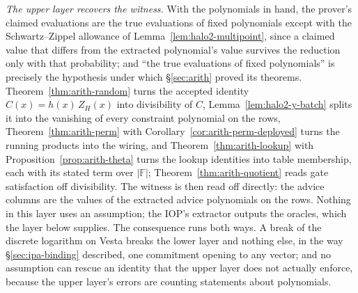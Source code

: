 \documentclass[11pt,a4paper]{article}
\theoremstyle{definition}
\newcommand{\F}{\mathbb{F}}
\newcommand{\ZH}{Z_H}
\begin{document}
\emph{The upper layer recovers the witness.} With the polynomials in
hand, the prover's claimed evaluations are the true evaluations of fixed
polynomials except with the Schwartz--Zippel allowance of
Lemma~\ref{lem:halo2-multipoint}, since a claimed value that differs from
the extracted polynomial's value survives the reduction only with that
probability; and ``the true evaluations of fixed polynomials'' is
precisely the hypothesis under which \S\ref{sec:arith} proved its
theorems. Theorem~\ref{thm:arith-random} turns the accepted identity
$C(x) = h(x)\,\ZH(x)$ into divisibility of $C$,
Lemma~\ref{lem:halo2-y-batch} splits it into the vanishing of every
constraint polynomial on the rows, Theorem~\ref{thm:arith-perm} with
Corollary~\ref{cor:arith-perm-deployed} turns the running products into
the wiring, and Theorem~\ref{thm:arith-lookup} with
Proposition~\ref{prop:arith-theta} turns the lookup identities into table
membership, each with its stated term over $|\F|$;
Theorem~\ref{thm:arith-quotient} reads gate satisfaction off
divisibility. The witness is then read off directly: the advice columns
are the values of the extracted advice polynomials on the rows. Nothing
in this layer uses an assumption; the IOP's extractor outputs the
oracles, which the layer below supplies. The consequence
runs both ways. A break of the discrete logarithm on Vesta breaks the
lower layer and nothing else, in the way \S\ref{sec:ipa-binding}
described, one commitment opening to any vector; and no assumption can
rescue an identity that the upper layer does not actually enforce,
because the upper layer's errors are counting statements about
polynomials.
\end{document}
